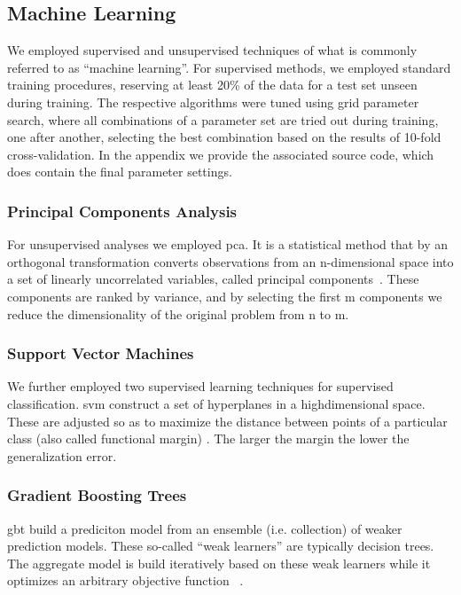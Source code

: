 \subsection{Machine Learning}

We employed supervised and unsupervised techniques of what is commonly referred to as ``machine learning''. For supervised methods, we employed standard training procedures, reserving at least 20\% of the data for a test set unseen during training. The respective algorithms were tuned using grid parameter search, where all combinations of a parameter set are tried out during training, one after another, selecting the best combination based on the results of 10-fold cross-validation. In the appendix we provide the associated source code, which does contain the final parameter settings.


\subsubsection{Principal Components Analysis}

For unsupervised analyses we employed \gls{pca}. It is a statistical method that by an orthogonal transformation converts observations from an n-dimensional space into a set of linearly uncorrelated variables, called principal components~\cite{Pearson1901-ul}. These components are ranked by variance, and by selecting the first m components we reduce the dimensionality of the original problem from n to m.


\subsubsection{Support Vector Machines}

We further employed two supervised learning techniques for supervised classification. \gls{svm} construct a set of hyperplanes in a highdimensional space. These are adjusted so as to maximize the distance between points of a particular class (also called functional margin) \cite{Cortes1995-eq}. The larger the margin the lower the generalization error.


\subsubsection{Gradient Boosting Trees}

\gls{gbt} build a prediciton model from an ensemble (i.e. collection) of weaker prediction models. These so-called ``weak learners'' are typically decision trees. The aggregate model is build iteratively based on these weak learners while it optimizes an arbitrary objective function ~\cite{Friedman2009-mc, Friedman2001-rh, Breiman2004-za}.

